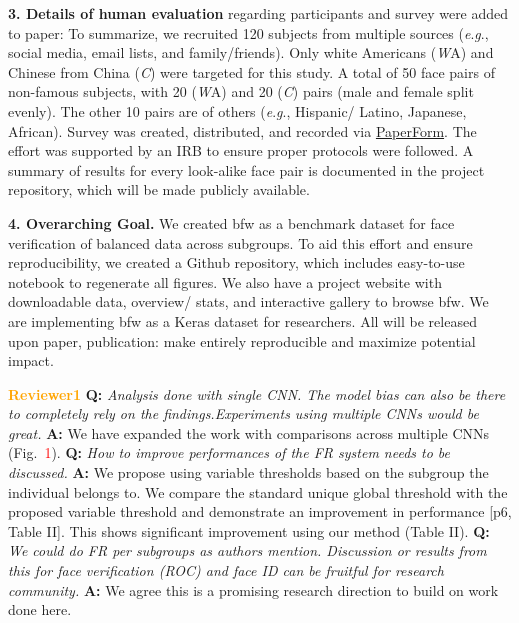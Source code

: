\documentclass[10pt,twocolumn,letterpaper]{article}
\newcommand{\ie}{\textit{i}.\textit{e}., }
\newcommand{\eg}{\textit{e}.\textit{g}., }
\begin{document}
\noindent\textbf{3. Details of human evaluation} regarding participants and survey were added to paper: To summarize, we recruited 120 subjects from multiple sources (\eg social media, email lists, and family/friends). Only white Americans ({\emph WA}) and Chinese from China ({\emph C}) were  targeted for this study. A total of 50 face pairs of non-famous subjects, with 20 ({\emph WA}) and 20 ({\emph C}) pairs (male and female split evenly). The other 10 pairs are of others (\eg Hispanic/ Latino, Japanese, African). Survey was created, distributed, and recorded via \href{https://paperform.co}{PaperForm}. The effort was supported by an IRB to ensure proper protocols were followed. A summary of results for every look-alike face pair is documented in the project repository, which will be made publicly available.

\noindent\textbf{4. Overarching Goal.} We created \gls{bfw} as a benchmark dataset for face verification of balanced data across subgroups. To aid this effort and ensure reproducibility, we created a Github repository, which includes easy-to-use notebook to regenerate all figures. We also have a project website with downloadable data, overview/ stats, and interactive gallery to browse \gls{bfw}. We are implementing \gls{bfw} as a Keras dataset for researchers. All will be released upon paper, publication: make entirely reproducible and maximize potential impact.

  

   
\noindent\textbf{\textcolor{orange}{Reviewer1}}
\textbf{Q:} \textit{Analysis done with single CNN. The model bias can also be there to completely rely on the findings.Experiments using multiple CNNs would be great.} 
\textbf{A:} We have expanded the work with comparisons across multiple CNNs (Fig.~\textcolor{red}{1}). 
\textbf{Q:} \textit{How to improve performances of the FR system needs to be discussed.} 
\textbf{A:} We propose using variable thresholds based on the subgroup the individual belongs to. We compare the standard unique global threshold with the proposed variable threshold and demonstrate an improvement in performance [p6, Table II]. This shows significant improvement using our method (Table II). 
\textbf{Q:} \textit{We could do FR per subgroups as authors mention. Discussion or results from this for face verification (ROC) and face ID can be fruitful for research community.} 
\textbf{A:} We agree this is a promising research direction to build on work done here.
\end{document}
